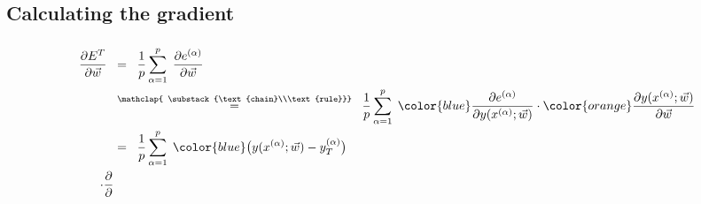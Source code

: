 \subsection{Calculating the gradient}

\begin{frame}\frametitle{\subsecname}
\begin{align}
\frac{\partial E^{T}}{\partial \vec w} 
\;\;&=\;\; 
\frac{1}{p} \sum_{\alpha=1}^{p} \; 
\frac{\partial e^{(\alpha)}}{\partial \vec w}\\
\;\;&\stackrel{\mathclap{
\substack{\text{chain}\\\text{rule}}}
}
{=}\;\;
\frac{1}{p} \sum_{\alpha=1}^{p} \;
{\color{blue}
\frac{\partial e^{(\alpha)}}{\partial y(x^{(\alpha)};\vec w)}
} 
\cdot
{\color{orange}
\frac{\partial y(x^{(\alpha)};\vec w)}{\partial \vec w}
}\\
\;\;&=\;\;
\frac{1}{p} \sum_{\alpha=1}^{p} \;
{\color{blue}
\big( y(x^{(\alpha)}; \vec w) - y_{T}^{(\alpha)} \big)
}\\
\cdot
\frac{\partial}{\partial}\\
\end{align}    
\end{frame}
